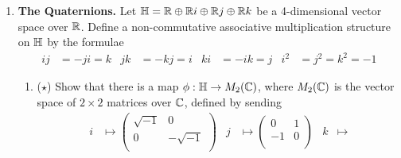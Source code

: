 \documentclass[../psets.tex]{subfiles}
\begin{document}
\begin{enumerate}
\begin{enumerate}
\begin{proof}
            Let $gH\in G/H$ be arbitrary. We seek to show that $\Stab(gH)=gHg^{-1}$. Suppose $\sigma\in\Stab(gH)$ is such that $\sigma\cdot gH=gH$. Then $\sigma gH=gH$, i.e., for every $h\in H$, there exists $h'\in H$ such that $\sigma gh=gh'$. It follows that $\sigma=gh'h^{-1}g^{-1}\in gHg^{-1}$.\par
            Therefore, we have that
            \begin{equation*}
                \ker = \bigcap_{gH\in G/H}\Stab(gH)
                = \bigcap_{g\in G}\Stab(gH)
                = \bigcap_{g\in G}gHg^{-1}
            \end{equation*}
            as desired.
        \end{proof}
        \item Prove that $N=\bigcap_{g\in G}gHg^{-1}$ is the largest normal subgroup of $G$ contained in $H$.
        \begin{proof}
            Suppose for the sake of contradiction that there exists $M\triangleleft G$ such that $M\subset H$ and $M\supsetneq N$.
        \end{proof}
    \end{enumerate}
    \item \textbf{The Quaternions.} Let $\mathbb{H}=\mathbb{R}\oplus\mathbb{R} i\oplus\mathbb{R} j\oplus\mathbb{R} k$ be a 4-dimensional vector space over $\mathbb{R}$. Define a non-commutative associative multiplication structure on $\mathbb{H}$ by the formulae
    \begin{align*}
        ij &= -ji = k&
        jk &= -kj = i&
        ki &= -ik = j&
        i^2 &= j^2 = k^2 = -1
    \end{align*}
    \begin{enumerate}
        \item ($\star$) Show that there is a map $\phi:\mathbb{H}\to M_2(\mathbb{C})$, where $M_2(\mathbb{C})$ is the vector space of $2\times 2$ matrices over $\mathbb{C}$, defined by sending
        \begin{align*}
            i &\mapsto
            \begin{pmatrix}
                \sqrt{-1} & 0\\
                0 & -\sqrt{-1}\\
            \end{pmatrix}&
            j &\mapsto
            \begin{pmatrix}
                0 & 1\\
                -1 & 0\\
            \end{pmatrix}&
            k &\mapsto

\end{align*}
\end{enumerate}
\end{enumerate}
\end{document}
